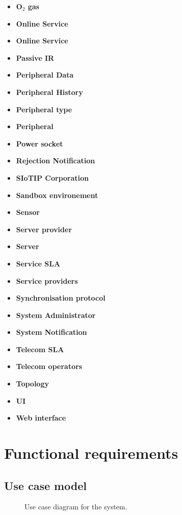 \documentclass[english]{sareport}
\begin{document}
\begin{itemize}
	\item \textbf{O$_2$ gas}
	\item \textbf{Online Service}
	\item \textbf{Online Service}
	\item \textbf{Passive IR}
	\item \textbf{Peripheral Data}
	\item \textbf{Peripheral History}
	\item \textbf{Peripheral type}
	\item \textbf{Peripheral}
	\item \textbf{Power socket}
	\item \textbf{Rejection Notification}
	\item \textbf{SIoTIP Corporation}
	\item \textbf{Sandbox environement}
	\item \textbf{Sensor}
	\item \textbf{Server provider}
	\item \textbf{Server}
	\item \textbf{Service SLA}
	\item \textbf{Service providers}
	\item \textbf{Synchronisation protocol}
	\item \textbf{System Administrator}
	\item \textbf{System Notification}
	\item \textbf{Telecom SLA}
	\item \textbf{Telecom operators}
	\item \textbf{Topology}
	\item \textbf{UI}
	\item \textbf{Web interface}
\end{itemize}

\chapter{Functional requirements}\label{sec:functional}
\section*{Use case model}

\begin{figure}[!htp]
    \centering
    \caption{Use case diagram for the system.}\label{fig:use_case_model}
\end{figure}
\end{document}
